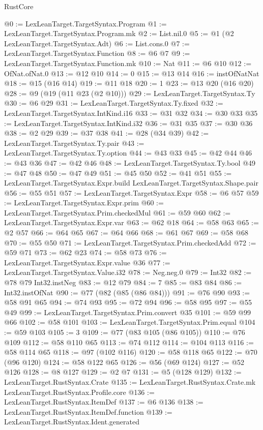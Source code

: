 \begin{lexlean}{RustCore}
\begin{coremodule}
@0 := LexLeanTarget.TargetSyntax.Program
@1 := LexLeanTarget.TargetSyntax.Program.mk
@2 := List.nil.{0}
@5 := @1 (@2 LexLeanTarget.TargetSyntax.Adt)
@6 := List.cons.{0}
@7 := LexLeanTarget.TargetSyntax.Function
@8 := @6 @7
@9 := LexLeanTarget.TargetSyntax.Function.mk
@10 := Nat
@11 := @6 @10
@12 := OfNat.ofNat.{0}
@13 := @12 @10
@14 := 0
@15 := @13 @14
@16 := instOfNatNat
@18 := @15 (@16 @14)
@19 := @11 @18
@20 := 1
@23 := @13 @20 (@16 @20)
@28 := @9 (@19 (@11 @23 (@2 @10)))
@29 := LexLeanTarget.TargetSyntax.Ty
@30 := @6 @29
@31 := LexLeanTarget.TargetSyntax.Ty.fixed
@32 := LexLeanTarget.TargetSyntax.IntKind.i16
@33 := @31 @32
@34 := @30 @33
@35 := LexLeanTarget.TargetSyntax.IntKind.i32
@36 := @31 @35
@37 := @30 @36
@38 := @2 @29
@39 := @37 @38
@41 := @28 (@34 @39)
@42 := LexLeanTarget.TargetSyntax.Ty.pair
@43 := LexLeanTarget.TargetSyntax.Ty.option
@44 := @43 @33
@45 := @42 @44
@46 := @43 @36
@47 := @42 @46
@48 := LexLeanTarget.TargetSyntax.Ty.bool
@49 := @47 @48
@50 := @47 @49
@51 := @45 @50
@52 := @41 @51
@55 := LexLeanTarget.TargetSyntax.Expr.build LexLeanTarget.TargetSyntax.Shape.pair
@56 := @55 @51
@57 := LexLeanTarget.TargetSyntax.Expr
@58 := @6 @57
@59 := LexLeanTarget.TargetSyntax.Expr.prim
@60 := LexLeanTarget.TargetSyntax.Prim.checkedMul
@61 := @59 @60
@62 := LexLeanTarget.TargetSyntax.Expr.var
@63 := @62 @18
@64 := @58 @63
@65 := @2 @57
@66 := @64 @65
@67 := @64 @66
@68 := @61 @67
@69 := @58 @68
@70 := @55 @50
@71 := LexLeanTarget.TargetSyntax.Prim.checkedAdd
@72 := @59 @71
@73 := @62 @23
@74 := @58 @73
@76 := LexLeanTarget.TargetSyntax.Expr.value @36
@77 := LexLeanTarget.TargetSyntax.Value.i32
@78 := Neg.neg.{0}
@79 := Int32
@82 := @78 @79 Int32.instNeg
@83 := @12 @79
@84 := 7
@85 := @83 @84
@86 := Int32.instOfNat
@90 := @77 (@82 (@85 (@86 @84)))
@91 := @76 @90
@93 := @58 @91 @65
@94 := @74 @93
@95 := @72 @94
@96 := @58 @95
@97 := @55 @49
@99 := LexLeanTarget.TargetSyntax.Prim.convert @35
@101 := @59 @99 @66
@102 := @58 @101
@103 := LexLeanTarget.TargetSyntax.Prim.equal
@104 := @59 @103
@105 := 3
@109 := @77 (@83 @105 (@86 @105))
@110 := @76 @109
@112 := @58 @110 @65
@113 := @74 @112
@114 := @104 @113
@116 := @58 @114 @65
@118 := @97 (@102 @116)
@120 := @58 @118 @65
@122 := @70 (@96 @120)
@124 := @58 @122 @65
@126 := @56 (@69 @124)
@127 := @52 @126
@128 := @8 @127
@129 := @2 @7
@131 := @5 (@128 @129)
@132 := LexLeanTarget.RustSyntax.Crate
@135 := LexLeanTarget.RustSyntax.Crate.mk LexLeanTarget.RustSyntax.Profile.core
@136 := LexLeanTarget.RustSyntax.ItemDef
@137 := @6 @136
@138 := LexLeanTarget.RustSyntax.ItemDef.function
@139 := LexLeanTarget.RustSyntax.Ident.generated

\end{coremodule}
\end{lexlean}
